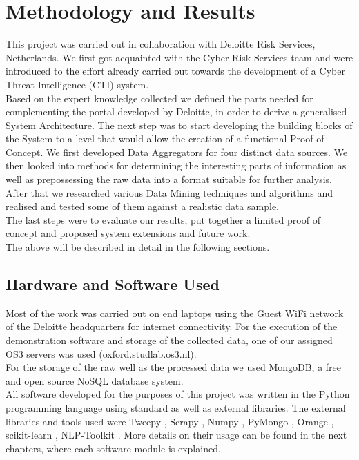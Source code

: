 \documentclass[12pt]{article}
\begin{document}
\section{Methodology and Results}
This project was carried out in collaboration with Deloitte Risk Services, Netherlands. We first got acquainted with the Cyber-Risk Services team and were introduced to the effort already carried out towards the development of a Cyber Threat Intelligence (CTI) system. \\
Based on the expert knowledge collected we defined the parts needed for complementing the portal developed by Deloitte, in order to derive a generalised System Architecture. The next step was to start developing the building blocks of the System to a level that would allow the creation of a functional Proof of Concept. We first developed Data Aggregators for four distinct data sources. We then looked into methods for determining the interesting parts of information as well as prepossessing the raw data into a format suitable for further analysis. After that we researched various Data Mining techniques and algorithms and realised and tested some of them against a realistic data sample. \\
The last steps were to evaluate our results, put together a limited proof of concept and proposed system extensions and future work. \\
The above will be described in detail in the following sections. 

\subsection{Hardware and Software Used}


Most of the work was carried out on end laptops using the Guest WiFi network of the Deloitte headquarters for internet connectivity. For the execution of the demonstration software and storage of the collected data, one of our assigned OS3 servers was used (oxford.studlab.os3.nl).\\ 
For the storage of the raw well as the processed data we used MongoDB, a free and open source NoSQL database system.\\ 
All software developed for the purposes of this project was written in the Python programming language using standard as well as external libraries. The external libraries and tools used were Tweepy \cite{tweepy}, Scrapy \cite{scrapy}, Numpy \cite{numpy}, PyMongo \cite{pymongo}, Orange \cite{orange}, scikit-learn \cite{sklearn}, NLP-Toolkit \cite{nltk}. More details on their usage can be found in the next chapters, where each software module is explained.
\end{document}
